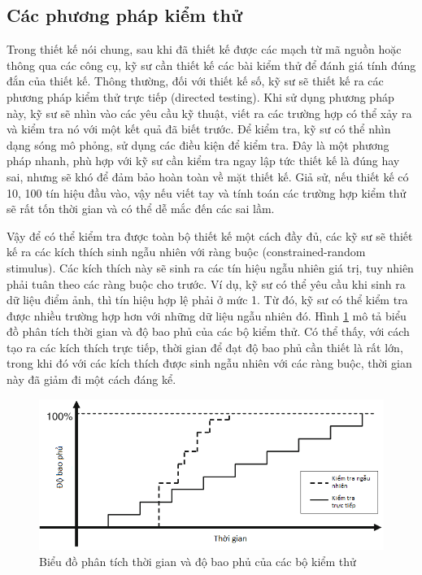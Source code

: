 \subsection{Các phương pháp kiểm thử}
Trong thiết kế nói chung, sau khi đã thiết kế được các mạch từ mã nguồn hoặc thông qua các công cụ, kỹ sư cần thiết kế các bài kiểm thử để đánh giá tính đúng đắn của thiết kế. Thông thường, đối với thiết kế số, kỹ sư sẽ thiết kế ra các phương pháp kiểm thử trực tiếp (directed testing). Khi sử dụng phương pháp này, kỹ sư sẽ nhìn vào các yêu cầu kỹ thuật, viết ra các trường hợp có thể xảy ra và kiểm tra nó với một kết quả đã biết trước. Để kiểm tra, kỹ sư có thể nhìn dạng sóng mô phỏng, sử dụng các điều kiện để kiểm tra. Đây là một phương pháp nhanh, phù hợp với kỹ sư cần kiểm tra ngay lập tức thiết kế là đúng hay sai, nhưng sẽ khó để đảm bảo hoàn toàn về mặt thiết kế. Giả sử, nếu thiết kế có 10, 100 tín hiệu đầu vào, vậy nếu viết tay và tính toán các trường hợp kiểm thử sẽ rất tốn thời gian và có thể dễ mắc đến các sai lầm.

Vậy để có thể kiểm tra được toàn bộ thiết kế một cách đầy đủ, các kỹ sư sẽ thiết kế ra các kích thích sinh ngẫu nhiên với ràng buộc (constrained-random stimulus). Các kích thích này sẽ sinh ra các tín hiệu ngẫu nhiên giá trị, tuy nhiên phải tuân theo các ràng buộc cho trước. Ví dụ, kỹ sư có thể yêu cầu khi sinh ra dữ liệu điểm ảnh, thì tín hiệu hợp lệ phải ở mức 1. Từ đó, kỹ sư có thể kiểm tra được nhiều trường hợp hơn với những dữ liệu ngẫu nhiên đó. Hình \ref{fig:verificationEva} mô tả biểu đồ phân tích thời gian và độ bao phủ của các bộ kiểm thử. Có thể thấy, với cách tạo ra các kích thích trực tiếp, thời gian để đạt độ bao phủ cần thiết là rất lớn, trong khi đó với các kích thích được sinh ngẫu nhiên với các ràng buộc, thời gian này đã giảm đi một cách đáng kể.

\begin{figure}[!ht]
\centering
\includegraphics[width=\linewidth]{figures/verificationEva.png}
\caption{Biểu đồ phân tích thời gian và độ bao phủ của các bộ kiểm thử}
\label{fig:verificationEva}
\end{figure}

